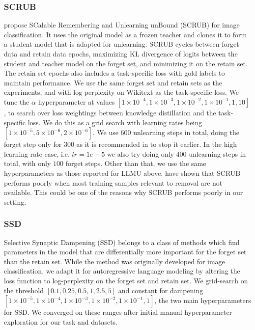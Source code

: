 \subsubsection{SCRUB}
\citet{kurmanji2023towards} propose SCalable Remembering and Unlearning unBound (SCRUB) for image classification. It uses the original model as a frozen teacher and clones it to form a student model that is adapted for unlearning. SCRUB cycles between forget data and retain data epochs, maximizing KL divergence of logits between the student and teacher model on the forget set, and minimizing it on the retain set. The retain set epochs also includes a task-specific loss with gold labels to maintain performance. We use the same forget set and retain sets as the \method{} experiments, and with log perplexity on Wikitext as the task-specific loss. We tune the $\alpha$ hyperparameter at values $[1 \times 10^{-4}, 1 \times 10^{-3}, 1 \times 10^{-2}, 1 \times 10^{-1}, 1, 10]$, to search over loss weightings between knowledge distillation and the task-specific loss. We do this as a grid search with learning rates being $[1\times10^{-5}, 5\times10^{-6}, 2\times 10^{-6}]$. We use $600$ unlearning steps in total, doing the forget step only for $300$ as it is recommended in \citet{kurmanji2023towards} to stop it earlier. In the high learning rate case, i.e. $lr=1e-5$ we also try doing only $400$ unlearning steps in total, with only $100$ forget steps. Other than that, we use the same hyperparameters as those reported for LLMU above. \citet{goel2024corrective} have shown that SCRUB performs poorly when most training samples relevant to removal are not available. This could be one of the reasons why SCRUB performs poorly in our setting. 

\subsubsection{SSD}
Selective Synaptic Dampening (SSD) \citep{foster2023fast} belongs to a class of methods which find parameters in the model that are differentially more important for the forget set than the retain set. While the method was originally developed for image classification, we adapt it for autoregressive language modeling by altering the loss function to log-perplexity on the forget set and retain set. We grid-search on the threshold $[0.1, 0.25, 0.5, 1, 2.5, 5]$ and constant for dampening $[1 \times 10^{-5}, 1 \times 10^{-4}, 1 \times 10^{-3}, 1 \times 10^{-2}, 1 \times 10^{-1}, 1]$, the two main hyperparameters for SSD. We converged on these ranges after initial manual hyperparameter exploration for our task and datasets.


